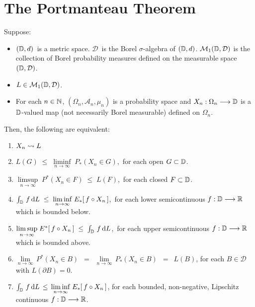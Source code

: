 

\section{The Portmanteau Theorem}
\setcounter{theorem}{0}
\setcounter{equation}{0}


\renewcommand{\theenumi}{\roman{enumi}}
\renewcommand{\labelenumi}{\textnormal{(\theenumi)}$\;\;$}


\begin{theorem}
\mbox{}\vskip 0.1cm
\noindent
Suppose:
\begin{itemize}
\item
	$(\mathbb{D},d)$\, is a metric space.
	$\mathcal{D}$\, is the Borel $\sigma$-algebra of $(\mathbb{D},d)$.
	\vskip 0.0cm
	$\mathcal{M}_{1}(\mathbb{D},\mathcal{D})$ is the collection of Borel probability measures
	defined on the measurable space $(\mathbb{D},\mathcal{D})$.
\item
	$L \in \mathcal{M}_{1}(\mathbb{D},\mathcal{D})$.
\item
	For each $n \in \mathbb{N}$,
	$(\Omega_{n},\mathcal{A}_{n},\mu_{n})$ is a probability space and
	$X_{n} : \Omega_{n} \longrightarrow \mathbb{D}$
	is a $\mathbb{D}$-valued map (not necessarily Borel measurable) defined on $\Omega_{n}$.
\end{itemize}
Then, the following are equivalent:
\begin{enumerate}
\item
	$X_{n} \rightsquigarrow L$
\item
	$L(G) \;\leq\; \underset{n\rightarrow\infty}{\liminf}\; P_{*}(X_{n} \in G)$,\, for each open $G \subset \mathbb{D}$.
\item
	$\underset{n\rightarrow\infty}{\limsup}\; P^{*}(X_{n} \in F) \;\leq\; L(F)$,\, for each closed $F \subset \mathbb{D}$.
\item
	$\int_{\mathbb{D}}\, f \,\textnormal{d} L \;\leq\; \underset{n\rightarrow\infty}{\liminf}\; E_{*}\!\left[\,f \circ X_{n}\,\right]$,\,
	for each lower semicontinuous $f : \mathbb{D} \longrightarrow \mathbb{R}$ which is bounded below.
\item
	$\underset{n\rightarrow\infty}{\limsup}\; E^{*}\!\left[\,f \circ X_{n}\,\right] \;\leq\; \int_{\mathbb{D}}\, f \,\textnormal{d} L$,\,
	for each upper semicontinuous $f : \mathbb{D} \longrightarrow \mathbb{R}$ which is bounded above.
\item
	$\underset{n\rightarrow\infty}{\lim}\,P^{*}(X_{n} \in B)$
	\,$=$\, $\underset{n\rightarrow\infty}{\lim}\,P_{*}(X_{n} \in B)$
	\,$=$\, $L(B)$,
	for each $B \in \mathcal{D}$ with $L(\partial B) = 0$.
\item
	$\int_{\mathbb{D}}\,f\,\textnormal{d} L \,\leq\, \underset{n\rightarrow\infty}{\liminf}\;E_{*}\!\left[\,f \circ X_{n}\,\right]$,
	for each bounded, non-negative, Lipschitz continuous $f : \mathbb{D} \longrightarrow \mathbb{R}$.
\end{enumerate}
\end{theorem}
